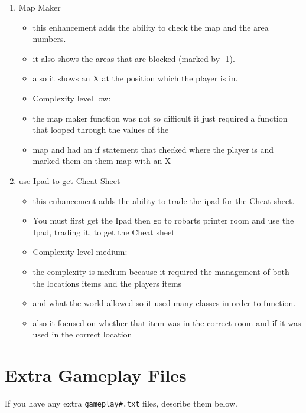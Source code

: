 \documentclass[11pt]{article}
\begin{document}
\begin{enumerate}
\item Map Maker
	\begin{itemize}
	\item this enhancement adds the ability to check the map and the area numbers.
	\item it also shows the areas that are blocked (marked by -1).
	\item also it shows an X at the position which the player is in.
	\item Complexity level low:
	\item the map maker function was not so difficult it just required a function that looped through the values of the
	\item map and had an if statement that checked where the player is and marked them on them map with an X
	\end{itemize}

\item use Ipad to get Cheat Sheet
	\begin{itemize}
	\item this enhancement adds the ability to trade the ipad for the Cheat sheet.
	\item You must first get the Ipad then go to robarts printer room and use the Ipad, trading it, to get the Cheat sheet
	\item Complexity level medium:
	\item the complexity is medium because it required the management of both the locations items and the players items
	\item and what the world allowed so it used many classes in order to function.
	\item also it focused on whether that item was in the correct room and if it was used in the correct location
	\end{itemize}


\end{enumerate}


\section*{Extra Gameplay Files}

If you have any extra \texttt{gameplay\#.txt} files, describe them below.
\end{document}
